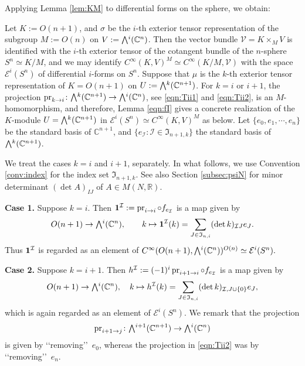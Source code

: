 Applying Lemma \ref{lem:KM}
 to differential forms
 on the sphere, 
 we obtain:
\begin{example}
\label{ex:KMi}
Let $K:=O(n+1)$, 
 and $\sigma$ be the $i$-th exterior tensor representation
 of the subgroup $M:=O(n)$ on $V:= \Exterior^i({\mathbb{C}}^{n})$.  
Then the vector bundle ${\mathcal{V}}=K \times_M V$ is identified
 with the $i$-th exterior tensor
 of the cotangent bundle
 of the $n$-sphere $S^n \simeq K/M$, 
 and we may identify $C^{\infty}(K,V)^M \simeq  C^{\infty}(K/M,{\mathcal{V}})$
 with the space ${\mathcal{E}}^i(S^n)$
 of differential $i$-forms on $S^n$.  
Suppose that $\mu$ is the $k$-th exterior tensor representation
 of $K=O(n+1)$ on $U:= \Exterior^k({\mathbb{C}}^{n+1})$.  
For $k=i$ or $i+1$, 
 the projection 
$
  \pr {k}i \colon \Exterior^{k}({\mathbb{C}}^{n+1}) \to \Exterior^i({\mathbb{C}}^n)
$, 
 see \eqref{eqn:Tii1} and \eqref{eqn:Tii2}, 
 is an $M$-homomorphism, 
 and therefore,
 Lemma \ref{eqn:fI} gives a concrete realization
 of the $K$-module $U=\Exterior^k({\mathbb{C}}^{n+1})$ in ${\mathcal{E}}^i(S^n)\simeq C^{\infty}(K,V)^M$ as below.  
Let $\{e_0, e_1, \cdots, e_n\}$ be the standard basis of ${\mathbb{C}}^{n+1}$, 
 and $\{e_{\mathcal{I}}: {\mathcal{I}} \in {\mathfrak {I}}_{n+1,k}\}$
 the standard basis of $\Exterior^k({\mathbb{C}}^{n+1})$.  



We treat the cases $k=i$ and $i+1$, 
 separately.  
In what follows,
 we use Convention \ref{conv:index}
 for the index set ${\mathfrak {I}}_{n+1,k}$.
See also Section \ref{subsec:psiN} 
 for minor determinant $(\det A)_{I J}$
 of $A \in M(N,{\mathbb{R}})$.  
\par\noindent
{\bf{Case 1.}}\enspace
Suppose $k=i$.  
Then 
$
{\bf{1}}^{\mathcal{I}}:=\operatorname{pr}_{{i}\to{i}} \circ f_{e_{\mathcal{I}}}
$ is a map given by 
\begin{equation}
\label{eqn:fI}
O(n+1) \to \Exterior^i({\mathbb{C}}^n), 
\qquad
  k \mapsto 
  {\bf{1}}^{\mathcal{I}}(k)=\sum_{J \in {\mathfrak {I}_{n,i}}}
  (\det k)_{{\mathcal{I}}J} e_J.  
\end{equation}
Thus ${\bf{1}}^{\mathcal{I}}$ is regarded as an element
 of 
$
   C^{\infty}(O(n+1),\Exterior^i({\mathbb{C}}^n))^{O(n)}\simeq {\mathcal{E}}^i(S^n).  
$
\end{example}

\par\noindent
{\bf{Case 2.}}\enspace
Suppose $k=i+1$.  
Then 
$
h^{\mathcal{I}} := (-1)^i \operatorname{pr}_{{i+1}\to{i}} \circ f_{e_{\mathcal{I}}}
$
 is a map given by 
\begin{equation}
\label{eqn:hJ}
O(n+1) \to \Exterior^i({\mathbb{C}}^n),
\quad
k \mapsto 
  h^{\mathcal{I}}(k) =\sum_{J \in {\mathfrak{I}}_{n,i}}
          (\det k)_{{\mathcal{I}},J \cup \{0\}}e_J, 
\end{equation}
which is again regarded as an element
 of ${\mathcal{E}}^i(S^n)$.  
We remark
 that the projection
\[
   \pr {i+1} j \colon
   \Exterior^{i+1}({\mathbb{C}}^{n+1}) \to \Exterior^i({\mathbb{C}}^n)
\]
is given by \lq\lq{removing}\rq\rq\
 $e_0$, 
 whereas the projection in \eqref{eqn:Tii2} was by \lq\lq{removing}\rq\rq\
 $e_n$.  
 

